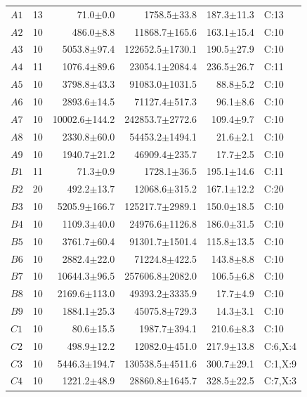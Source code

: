 \noindent\begin{supertabular}{@{}lrrrrl@{}}
$A1$ & 13 & 71.0$\pm$0.0 & 1758.5$\pm$33.8 & 187.3$\pm$11.3 & C:13 \\
$A2$ & 10 & 486.0$\pm$8.8 & 11868.7$\pm$165.6 & 163.1$\pm$15.4 & C:10 \\
$A3$ & 10 & 5053.8$\pm$97.4 & 122652.5$\pm$1730.1 & 190.5$\pm$27.9 & C:10 \\
$A4$ & 11 & 1076.4$\pm$89.6 & 23054.1$\pm$2084.4 & 236.5$\pm$26.7 & C:11 \\
$A5$ & 10 & 3798.8$\pm$43.3 & 91083.0$\pm$1031.5 & 88.8$\pm$5.2 & C:10 \\
$A6$ & 10 & 2893.6$\pm$14.5 & 71127.4$\pm$517.3 & 96.1$\pm$8.6 & C:10 \\
$A7$ & 10 & 10002.6$\pm$144.2 & 242853.7$\pm$2772.6 & 109.4$\pm$9.7 & C:10 \\
$A8$ & 10 & 2330.8$\pm$60.0 & 54453.2$\pm$1494.1 & 21.6$\pm$2.1 & C:10 \\
$A9$ & 10 & 1940.7$\pm$21.2 & 46909.4$\pm$235.7 & 17.7$\pm$2.5 & C:10 \\
$B1$ & 11 & 71.3$\pm$0.9 & 1728.1$\pm$36.5 & 195.1$\pm$14.6 & C:11 \\
$B2$ & 20 & 492.2$\pm$13.7 & 12068.6$\pm$315.2 & 167.1$\pm$12.2 & C:20 \\
$B3$ & 10 & 5205.9$\pm$166.7 & 125217.7$\pm$2989.1 & 150.0$\pm$18.5 & C:10 \\
$B4$ & 10 & 1109.3$\pm$40.0 & 24976.6$\pm$1126.8 & 186.0$\pm$31.5 & C:10 \\
$B5$ & 10 & 3761.7$\pm$60.4 & 91301.7$\pm$1501.4 & 115.8$\pm$13.5 & C:10 \\
$B6$ & 10 & 2882.4$\pm$22.0 & 71224.8$\pm$422.5 & 143.8$\pm$8.8 & C:10 \\
$B7$ & 10 & 10644.3$\pm$96.5 & 257606.8$\pm$2082.0 & 106.5$\pm$6.8 & C:10 \\
$B8$ & 10 & 2169.6$\pm$113.0 & 49393.2$\pm$3335.9 & 17.7$\pm$4.9 & C:10 \\
$B9$ & 10 & 1884.1$\pm$25.3 & 45075.8$\pm$729.3 & 14.3$\pm$3.1 & C:10 \\
$C1$ & 10 & 80.6$\pm$15.5 & 1987.7$\pm$394.1 & 210.6$\pm$8.3 & C:10 \\
$C2$ & 10 & 498.9$\pm$12.2 & 12082.0$\pm$451.0 & 217.9$\pm$13.8 & C:6,X:4 \\
$C3$ & 10 & 5446.3$\pm$194.7 & 130538.5$\pm$4511.6 & 300.7$\pm$29.1 & C:1,X:9 \\
$C4$ & 10 & 1221.2$\pm$48.9 & 28860.8$\pm$1645.7 & 328.5$\pm$22.5 & C:7,X:3 \\

\end{supertabular}
